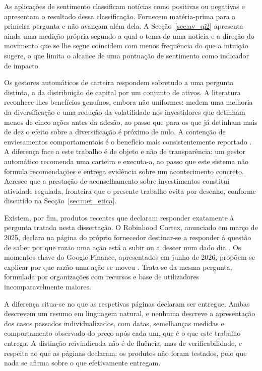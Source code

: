 As aplicações de sentimento classificam notícias como positivas ou negativas e apresentam o
resultado dessa classificação. Fornecem matéria-prima para a primeira pergunta e não avançam além
dela. A Secção~\ref{sec:av_qi2} apresenta ainda uma medição própria segundo a qual o tema de uma
notícia e a direção do movimento que se lhe segue coincidem com menos frequência do que a intuição
sugere, o que limita o alcance de uma pontuação de sentimento como indicador de impacto.

Os gestores automáticos de carteira respondem sobretudo a uma pergunta distinta, a da distribuição
de capital por um conjunto de ativos. A literatura reconhece-lhes benefícios genuínos, embora não
uniformes: \textcite{dacunto2019robo} medem uma melhoria da diversificação e uma redução da
volatilidade nos investidores que detinham menos de cinco ações antes da adesão, ao passo que para
os que já detinham mais de dez o efeito sobre a diversificação é próximo de nulo. A contenção de
enviesamentos comportamentais é o benefício mais consistentemente reportado
\autocite{dacunto2019robo, cardillo2024robo}. A diferença face a este trabalho é de objeto e não de
transparência: um gestor automático recomenda uma carteira e executa-a, ao passo que este sistema
não formula recomendações e entrega evidência sobre um acontecimento concreto. Acresce que a
prestação de aconselhamento sobre investimentos constitui atividade regulada, fronteira que o
presente trabalho evita por desenho, conforme discutido na Secção~\ref{sec:met_etica}.

Existem, por fim, produtos recentes que declaram responder exatamente à pergunta tratada nesta
dissertação. O Robinhood Cortex, anunciado em março de 2025, declara na página do próprio
fornecedor destinar-se a responder à questão de saber por que razão uma ação está a subir ou a
descer num dado dia \autocite{robinhood2025cortex}. Os momentos-chave do Google Finance,
apresentados em junho de 2026, propõem-se explicar por que razão uma ação se moveu
\autocite{google2026finance}. Trata-se da mesma pergunta, formulada por organizações com recursos e
base de utilizadores incomparavelmente maiores.

A diferença situa-se no que as respetivas páginas
declaram ser entregue. Ambas descrevem um resumo em linguagem natural, e nenhuma descreve a
apresentação dos casos passados individualizados, com datas, semelhanças medidas e comportamento
observado do preço após cada um, que é o que este trabalho entrega. A distinção reivindicada não é
de fluência, mas de verificabilidade, e respeita ao que as páginas declaram: os produtos não foram
testados, pelo que nada se afirma sobre o que efetivamente entregam.

